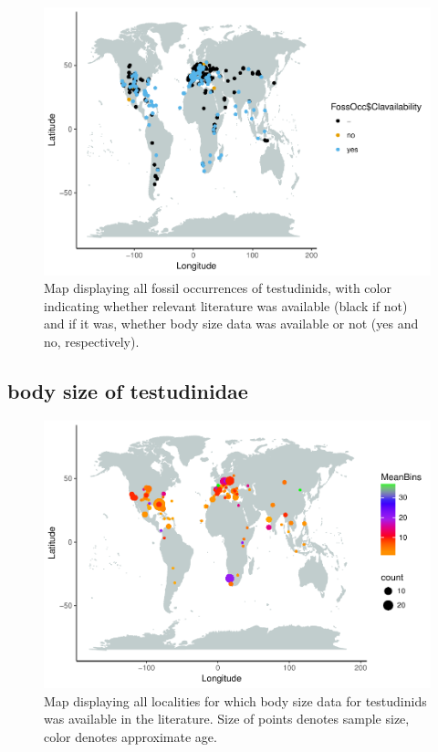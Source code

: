 \documentclass[]{article}
\begin{document}
\begin{figure}[htbp]
\centering
\includegraphics{MA_JJ_files/figure-latex/Map fossil occurrences-1.pdf}
\caption{Map displaying all fossil occurrences of testudinids, with
color indicating whether relevant literature was available (black if
not) and if it was, whether body size data was available or not (yes and
no, respectively).}
\end{figure}

\subsection{body size of testudinidae}\label{body-size-of-testudinidae}

\begin{figure}[htbp]
\centering
\includegraphics{MA_JJ_files/figure-latex/Map body size data set-1.pdf}
\caption{Map displaying all localities for which body size data for
testudinids was available in the literature. Size of points denotes
sample size, color denotes approximate age.}
\end{figure}
\end{document}
